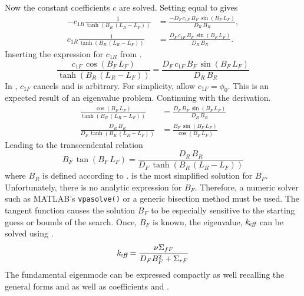   Now the constant coefficients $c$ are solved. Setting  
  equal to  gives
  \begin{align}
    -c_{1R} \frac{1}{\tanh(B_R\,(L_R-L_F))}
      &= \frac{-D_F \, c_{1F} \, B_F \, \sin(B_F \, L_F)}{D_R\,B_R}, \\
    c_{1R} \frac{1}{\tanh(B_R\,(L_R-L_F))}
      &= \frac{D_F \, c_{1F} \, B_F \, \sin(B_F \, L_F)}{D_R\,B_R}.
  \end{align}
  Inserting the expression for $c_{1R}$ from .
  \begin{equation}
    \label{eq:2reg_c1f_arbitrary}
    \frac{c_{1F} \, \cos(B_F \, L_F)}{\tanh(B_R \, (L_R-L_F))} =
      \frac{D_F \, c_{1F} \, B_F \, \sin(B_F \, L_F)}{D_R \, B_R}
  \end{equation}
  In , $c_{1F}$ cancels and is arbitrary. For
  simplicity, allow $c_{1F} = \phi_0$.
  This is an expected result of an eigenvalue problem. Continuing with the
  derivation.
  \begin{align}
    \frac{\cos(B_F \, L_F)}{\tanh(B_R \, (L_R-L_F))} &=
      \frac{D_F \, B_F \, \sin(B_F \, L_F)}{D_R \, B_R} \\
    \frac{D_R \, B_R}{D_F \, \tanh(B_R \, (L_R - L_F))} &= 
      \frac{B_F \, \sin(B_F \, L_F)}{\cos(B_F \, L_F)}
  \end{align}
  Leading to the transcendental relation
  \begin{equation}
    \label{eq:2reg_bf}
    B_F \, \tan(B_F \, L_F) = \frac{D_R \, B_R}{D_F \, \tanh(B_R \, (L_R-L_F))}
  \end{equation}
  where $B_R$ is defined according to . 
   is the most simplified solution for $B_F$. Unfortunately,
  there is no analytic expression for $B_F$. Therefore, a numeric solver 
  such as MATLAB's \verb|vpasolve()| or a generic bisection method must be used.
  The tangent function causes the solution $B_F$ to be especially sensitive to 
  the starting guess or bounds of the search. Once, $B_F$ is known, the 
  eigenvalue, $k_{\!\mbox{\scriptsize \em eff}}$ can be solved using .
  \begin{equation}
    \label{eq:keff2reg}
    k_{\!\mbox{\scriptsize \em eff}} = \frac{\nu \Sigma_{fF}}{D_F B_F^2 + \Sigma_{rF}}
  \end{equation}
  The fundamental eigenmode can be expressed compactly as well recalling the
  general forms  and  as well as
  coefficients  and .
